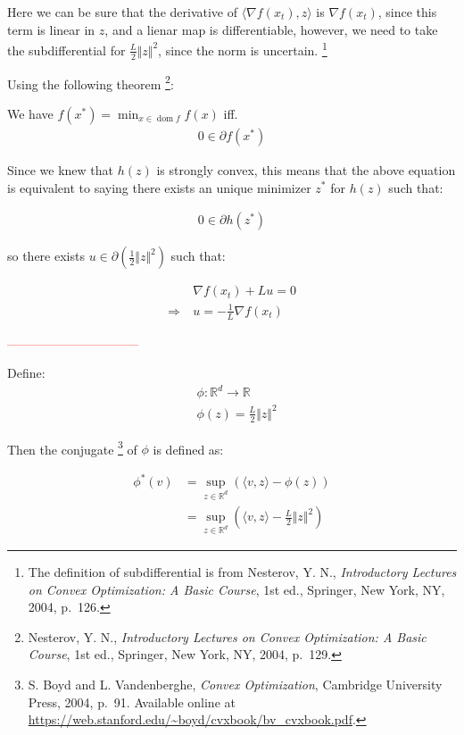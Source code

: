 \documentclass{article}
\DeclareMathOperator{\domain}{dom}
\begin{document}
Here we can be sure that the derivative of $\langle \nabla f(x_t), z \rangle$ is $\nabla f(x_t)$, since this term is linear in $z$, 
and a lienar map is differentiable, however, we need to take the subdifferential for $\frac{L}{2} \Vert z \Vert^2$, since the norm is uncertain.
\footnote{The definition of subdifferential is from Nesterov, Y. N., \textit{Introductory Lectures on Convex Optimization: A Basic Course}, 1st ed., Springer, New York, NY, 2004, p.~126.}
\bigskip

Using the following theorem
\footnote{Nesterov, Y. N., \textit{Introductory Lectures on Convex Optimization: A Basic Course}, 1st ed., Springer, New York, NY, 2004, p.~129.}:

\begin{tcolorbox}[greenbox, title = Theorem 3.1.15]
    We have $f(x^*) = \min_{x \in \domain f} f(x)$ iff.
    \begin{align*}
        0 \in \partial f(x^*)
    \end{align*}
\end{tcolorbox}

Since we knew that $h(z)$ is strongly convex, 
this means that the above equation is equivalent to saying 
there exists an unique minimizer $z^*$ for $h(z)$ such that:

\begin{align*}
    0 \in \partial h(z^*)
\end{align*}

so there exists $u \in \partial (\frac{1}{2} \Vert z \Vert^2)$ such that:

\begin{align*}
    &\nabla f(x_t) + Lu = 0 \\
    \Rightarrow \ &u = - \frac{1}{L} \nabla f(x_t)
\end{align*}

\textcolor{red}{--------------------------------}

Define: 
\begin{align*}
    &\phi: \mathbb{R}^d \to \mathbb{R} \\
    &\phi(z) = \frac{L}{2} \Vert z \Vert^2
\end{align*}

Then the conjugate
\footnote{S. Boyd and L. Vandenberghe, \textit{Convex Optimization}, Cambridge University Press, 2004, p.~91. 
Available online at \url{https://web.stanford.edu/~boyd/cvxbook/bv_cvxbook.pdf}.}
of $\phi$ is defined as:

\begin{align*}
    \phi^*(v) 
    &= \sup_{z \in \mathbb{R}^d} \left( \langle v, z \rangle - \phi(z) \right) \\
    &= \sup_{z \in \mathbb{R}^d} \left( \langle v, z \rangle - \frac{L}{2} \Vert z \Vert^2 \right)
\end{align*}
\end{document}
